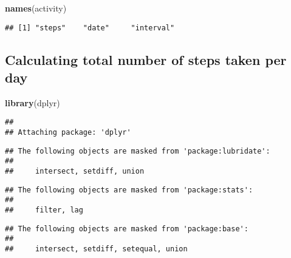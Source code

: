 \documentclass[]{article}
\newenvironment{Shaded}{\begin{snugshade}}{\end{snugshade}}
\newcommand{\KeywordTok}[1]{\textcolor[rgb]{0.13,0.29,0.53}{\textbf{{#1}}}}
\newcommand{\DataTypeTok}[1]{\textcolor[rgb]{0.13,0.29,0.53}{{#1}}}
\newcommand{\StringTok}[1]{\textcolor[rgb]{0.31,0.60,0.02}{{#1}}}
\newcommand{\NormalTok}[1]{{#1}}
\begin{document}
\begin{Shaded}
\begin{Highlighting}[]
\KeywordTok{names}\NormalTok{(activity)}
\end{Highlighting}
\end{Shaded}

\begin{verbatim}
## [1] "steps"    "date"     "interval"
\end{verbatim}

\begin{Shaded}
\end{Shaded}

\subsection{Calculating total number of steps taken per
day}\label{calculating-total-number-of-steps-taken-per-day}

\begin{Shaded}
\begin{Highlighting}[]
\KeywordTok{library}\NormalTok{(dplyr)}
\end{Highlighting}
\end{Shaded}

\begin{verbatim}
## 
## Attaching package: 'dplyr'
\end{verbatim}

\begin{verbatim}
## The following objects are masked from 'package:lubridate':
## 
##     intersect, setdiff, union
\end{verbatim}

\begin{verbatim}
## The following objects are masked from 'package:stats':
## 
##     filter, lag
\end{verbatim}

\begin{verbatim}
## The following objects are masked from 'package:base':
## 
##     intersect, setdiff, setequal, union
\end{verbatim}

\begin{Shaded}
\end{Shaded}
\end{document}
